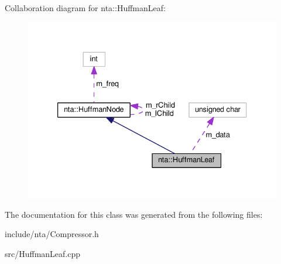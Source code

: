 Collaboration diagram for nta\+:\+:Huffman\+Leaf\+:\nopagebreak
\begin{figure}[H]
\begin{center}
\leavevmode
\includegraphics[width=333pt]{d7/d69/classnta_1_1HuffmanLeaf__coll__graph}
\end{center}
\end{figure}


The documentation for this class was generated from the following files\+:\begin{DoxyCompactItemize}
\item 
include/nta/Compressor.\+h\item 
src/Huffman\+Leaf.\+cpp\end{DoxyCompactItemize}
